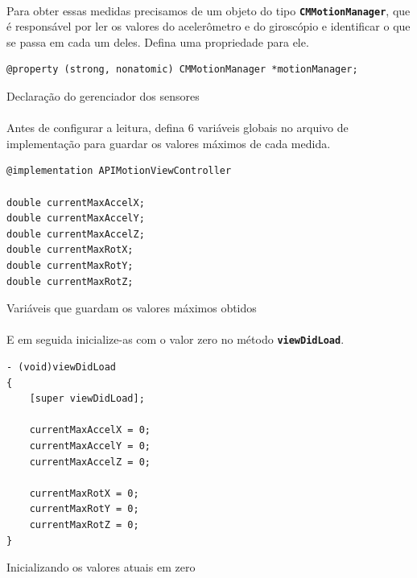 \documentclass[a4paper,12pt,brazil,doubleside]{book}
\begin{document}
\begin{singlespace}
\paragraph{}Para obter essas medidas precisamos de um objeto do tipo \texttt{\textbf{CMMotionManager}}, que é responsável por ler os valores do acelerômetro e do giroscópio e identificar o que se passa em cada um deles. Defina uma propriedade para ele.

\begin{listing}[H]
\begin{verbatim}
@property (strong, nonatomic) CMMotionManager *motionManager;
\end{verbatim}
\caption{Declaração do gerenciador dos sensores}
\end{listing}

\paragraph{}Antes de configurar a leitura, defina 6 variáveis globais no arquivo de implementação para guardar os valores máximos de cada medida.

\begin{listing}[H]
\begin{verbatim}
@implementation APIMotionViewController

double currentMaxAccelX;
double currentMaxAccelY;
double currentMaxAccelZ;
double currentMaxRotX;
double currentMaxRotY;
double currentMaxRotZ;
\end{verbatim}
\caption{Variáveis que guardam os valores máximos obtidos}
\end{listing}

\paragraph{}E em seguida inicialize-as com o valor zero no método \texttt{\textbf{viewDidLoad}}.

\begin{listing}[H]
\begin{verbatim}
- (void)viewDidLoad
{
    [super viewDidLoad];
    
    currentMaxAccelX = 0;
    currentMaxAccelY = 0;
    currentMaxAccelZ = 0;
    
    currentMaxRotX = 0;
    currentMaxRotY = 0;
    currentMaxRotZ = 0;
}
\end{verbatim}
\caption{Inicializando os valores atuais em zero}
\end{listing}


\end{singlespace}
\end{document}
